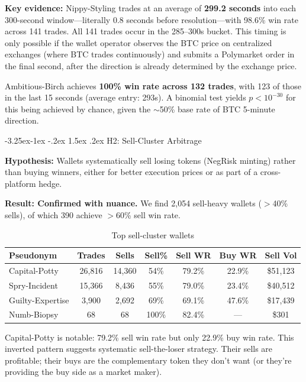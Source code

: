 \documentclass[11pt,a4paper]{article}
\makeatletter
\renewcommand\subsection{\@startsection{subsection}{2}{\z@}%
  {-3.25ex\@plus -1ex \@minus -.2ex}%
  {1.5ex \@plus .2ex}%
  {\normalfont\large\bfseries}}
\makeatother
\begin{document}
\textbf{Key evidence:} Nippy-Styling trades at an average of \textbf{299.2 seconds} into each 300-second window---literally 0.8 seconds before resolution---with 98.6\% win rate across 141 trades. All 141 trades occur in the 285--300s bucket. This timing is only possible if the wallet operator observes the BTC price on centralized exchanges (where BTC trades continuously) and submits a Polymarket order in the final second, after the direction is already determined by the exchange price.

Ambitious-Birch achieves \textbf{100\% win rate across 132 trades}, with 123 of those in the last 15 seconds (average entry: 293s). A binomial test yields $p < 10^{-30}$ for this being achieved by chance, given the $\sim$50\% base rate of BTC 5-minute direction.

\subsection{H2: Sell-Cluster Arbitrage}

\textbf{Hypothesis:} Wallets systematically sell losing tokens (NegRisk minting) rather than buying winners, either for better execution prices or as part of a cross-platform hedge.

\textbf{Result: Confirmed with nuance.} We find 2,054 sell-heavy wallets ($>$40\% sells), of which 390 achieve $>$60\% sell win rate.

\begin{table}[H]
\centering
\caption{Top sell-cluster wallets}
\label{tab:sell_cluster}
\small
\begin{tabular}{@{}lcccccc@{}}
\toprule
\textbf{Pseudonym} & \textbf{Trades} & \textbf{Sells} & \textbf{Sell\%} & \textbf{Sell WR} & \textbf{Buy WR} & \textbf{Sell Vol} \\
\midrule
Capital-Potty & 26,816 & 14,360 & 54\% & 79.2\% & 22.9\% & \$51,123 \\
Spry-Incident & 15,366 & 8,436 & 55\% & 79.0\% & 23.4\% & \$40,512 \\
Guilty-Expertise & 3,900 & 2,692 & 69\% & 69.1\% & 47.6\% & \$17,439 \\
Numb-Biopsy & 68 & 68 & 100\% & 82.4\% & --- & \$301 \\
\bottomrule
\end{tabular}
\end{table}

Capital-Potty is notable: 79.2\% sell win rate but only 22.9\% buy win rate. This inverted pattern suggests systematic sell-the-loser strategy. Their sells are profitable; their buys are the complementary token they don't want (or they're providing the buy side as a market maker).
\end{document}
